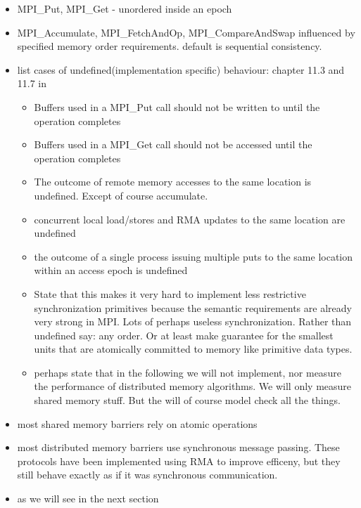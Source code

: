 \documentclass[a4paper, 10pt]{article}
\begin{document}
\begin{itemize}
\begin{itemize}
			\item MPI\_Put, MPI\_Get - unordered inside an epoch
			\item MPI\_Accumulate, MPI\_FetchAndOp, MPI\_CompareAndSwap influenced by specified memory order requirements. default is sequential consistency.
			\item list cases of undefined(implementation specific) behaviour: chapter 11.3 and 11.7 in \cite{mpi3}
				\begin{itemize}
					\item Buffers used in a MPI\_Put call should not be written to until the operation completes
					\item Buffers used in a MPI\_Get call should not be accessed until the operation completes
					\item The outcome of remote memory accesses to the same location is undefined. Except of course accumulate.
					\item concurrent local load/stores and RMA updates to the same location are undefined
					\item the outcome of a single process issuing multiple puts to the same location within an access epoch is undefined
					\item State that this makes it very hard to implement less restrictive synchronization primitives because the semantic requirements are already very strong in MPI. Lots of perhaps useless synchronization. Rather than undefined say: any order. Or at least make guarantee for the smallest units that are atomically committed to memory like primitive data types.
					\item perhaps state that in the following we will not implement, nor measure the performance of distributed memory algorithms. We will only measure shared memory stuff. But the will of course model check all the things.
				\end{itemize}
		\end{itemize}
\end{itemize}

\begin{itemize}
	\item most shared memory barriers rely on atomic operations
	\item most distributed memory barriers use synchronous message passing. These protocols have been implemented using RMA to improve efficeny, but they still behave exactly as if it was synchronous communication.
	\item as we will see in the next section
\end{itemize}
\end{document}
